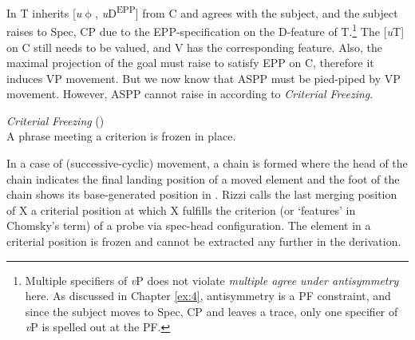 \ex\label{ex:163}
\z

In  T inherits [\textit{u}$\upphi$, \textit{u}D\textsuperscript{EPP}] from C and agrees with the subject, and the subject raises to Spec, \ac{CP} due to the \ac{EPP}-specification on the D-feature of T.\footnote{Multiple specifiers of \textit{v}P  does not violate \textit{multiple agree under antisymmetry} here. As discussed in Chapter \ref{ex:4}, antisymmetry is a \ac{PF} constraint, and since the subject moves to Spec, \ac{CP} and leaves a trace, only one specifier of \textit{v}P is spelled out at the  \ac{PF}.} The [\textit{u}T] on C still needs to be valued, and V has the corresponding feature. Also, the maximal projection of the goal must raise to satisfy \ac{EPP} on C, therefore it induces VP movement. But we now know that \ac{ASP}P must be pied-piped by VP movement. However, \ac{ASP}P cannot raise in  according to \textit{Criterial Freezing}.

\begin{exe}\ex\label{ex:164} \textit{Criterial} \textit{Freezing}  \hspace*{\fill}  (\citealt[11, (32)]{Rizzi2004}) \\
A phrase meeting a criterion is frozen in place.
\end{exe}

In a case of (successive-cyclic) movement, a chain is formed where the head of the chain indicates the final landing position of a moved element and the foot of the chain shows its base-generated position in . Rizzi calls the last merging position of X a criterial position at which X fulfills the criterion (or ‘features’ in Chomsky’s term) of a probe via spec-head configuration. The element in a criterial position is frozen and cannot be extracted any further in the derivation.

